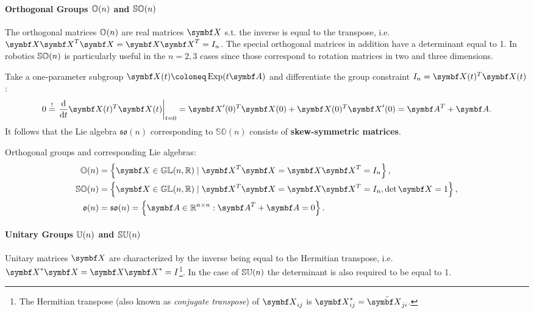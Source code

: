 \paragraph{Orthogonal Groups ${\mathbb{O}(n)}$ and ${\mathbb{SO}(n)}$}

The orthogonal matrices ${\mathbb{O}(n)}$ are real matrices $\X$ s.t. the inverse is equal to the transpose, i.e. $\X \X^{T} \X = \X \X^{T}= I_{n}$. The special orthogonal matrices in addition have a determinant equal to 1. In robotics ${\mathbb{SO}(n)}$ is particularly useful in the $n=2,3$ cases since those correspond to rotation matrices in two and three dimensions.

Take a one-parameter subgroup $\X(t) \coloneq \Exp(t \A)$ and differentiate the group constraint $I_{n} = \X(t) ^{T} \X(t)$:
\begin{equation}
  0 \overset{!}= \left. \frac{\mathrm{d}}{\mathrm{d} t} \X(t)^T \X(t) \right|_{t=0} = \X'(0)^T \X(0) + \X(0)^T \X'(0) = \A^T + \A.
\end{equation}
It follows that the Lie algebra $\mathfrak{so}(n)$ corresponding to $\mathbb{SO}(n)$ consists of \textbf{skew-symmetric matrices}.
\begin{important}
  Orthogonal groups and corresponding Lie algebras:
  \begin{subequations}
    \begin{align}
      \label{eq:On}
      \On             & = \left\{ \X \in \GL(n, \mathbb{R}) \mid \X^{T} \X = \X \X^{T}= I_{n} \right\}, \\
      \label{eq:SOn}
      \SOn            & = \left\{ \X \in \GL(n, \mathbb{R}) \mid \X^{T} \X = \X \X^{T}= I_{n}, \det \X = 1 \right\}, \\
      \label{eq:son}
      \mathfrak{o}(n) & = \mathfrak{so}(n) = \left\{ \A \in \mathbb{R}^{n \times n} : \A^T + \A = 0 \right\}.
    \end{align}
  \end{subequations}
\end{important}


\paragraph{Unitary Groups ${\mathbb{U}(n)}$ and ${\mathbb{SU}(n)}$}

Unitary matrices $\X$ are characterized by the inverse being equal to the Hermitian transpose, i.e. $\X^{*} \X = \X \X^{*} = I$\footnote{The Hermitian transpose (also known as \emph{conjugate transpose}) of $\X_{ij}$ is $\X_{ij}^* = \bar {\X_{ji}}$.}. In the case of ${\mathbb{SU}(n)}$ the determinant is also required to be equal to 1.

